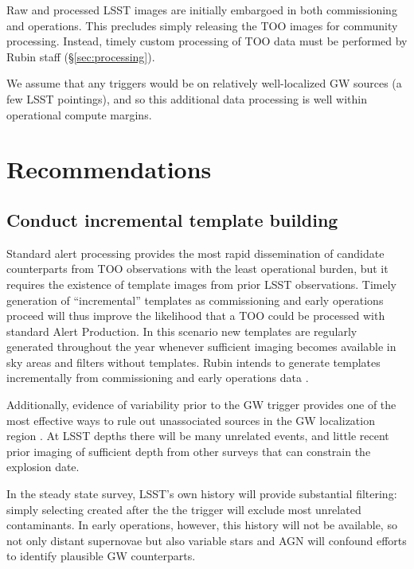 \documentclass[DM,authoryear,toc]{lsstdoc}
\begin{document}
Raw and processed LSST images are initially embargoed in both commissioning and operations.
This precludes simply releasing the TOO images for community processing.
Instead, timely custom processing of TOO data must be performed by Rubin staff (\S \ref{sec:processing}).

We assume that any triggers would be on relatively well-localized GW sources (a few LSST pointings), and so this additional data processing is well within operational compute margins.

\section{Recommendations}

\subsection{Conduct incremental template building} \label{sec:templates}

Standard alert processing provides the most rapid dissemination of candidate counterparts from TOO observations with the least operational burden, but it requires the existence of template images from prior LSST observations.
Timely generation of ``incremental'' templates as commissioning and early operations proceed will thus improve the likelihood that a TOO could be processed with standard Alert Production.
In this scenario new templates are regularly generated throughout the year whenever sufficient imaging becomes available in sky areas and filters without templates.  
Rubin intends to generate templates incrementally from commissioning and early operations data .

Additionally, evidence of variability prior to the GW trigger provides one of the most effective ways to rule out unassociated sources in the GW localization region \citep[e.g.,][]{2019GCN.24223....1C, 2019GCN.26430....1S}.
At LSST depths there will be many unrelated events, and little recent prior imaging of sufficient depth from other surveys that can constrain the explosion date.

In the steady state survey, LSST's own history will provide substantial filtering: simply selecting \DIAObjects created after the the trigger will exclude most unrelated contaminants.
In early operations, however, this history will not be available, so not only distant supernovae but also variable stars and AGN will confound efforts to identify plausible GW counterparts.
\end{document}
